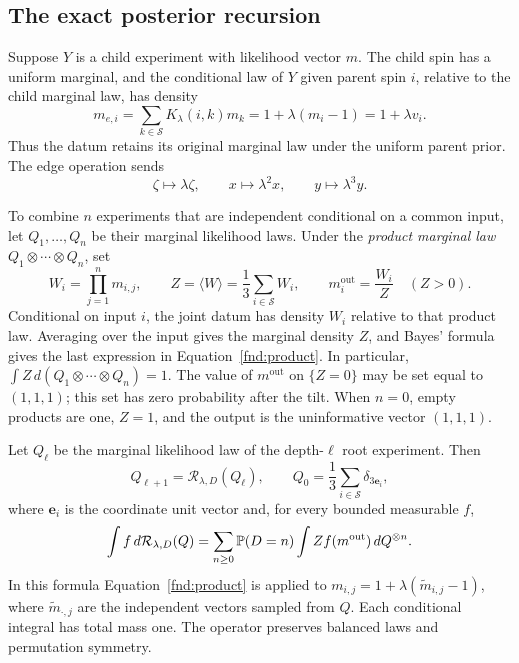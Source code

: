 \subsection{The exact posterior recursion}

Suppose \(Y\) is a child experiment with likelihood vector \(m\).
The child spin has a uniform marginal, and the conditional law of \(Y\)
given parent spin \(i\), relative to the child marginal law, has density
\begin{equation}\label{fnd:edge}
 m_{e,i}=\sum_{k\in\mathcal S}K_\lambda(i,k)m_k
        =1+\lambda(m_i-1)=1+\lambda v_i.
\end{equation}
Thus the datum retains its original marginal law under the uniform
parent prior.  The edge operation sends
\begin{equation}\label{fnd:edge-moments}
 \zeta\longmapsto\lambda\zeta,\qquad
 x\longmapsto\lambda^2x,\qquad y\longmapsto\lambda^3y.
\end{equation}

To combine \(n\) experiments that are independent conditional on a
common input, let \(Q_1,\ldots,Q_n\) be their marginal likelihood laws.
Under the \emph{product marginal law} \(Q_1\otimes\cdots\otimes Q_n\),
set
\begin{equation}\label{fnd:product}
 W_i=\prod_{j=1}^n m_{i,j},\qquad
 Z=\langle W\rangle=\frac13\sum_{i\in\mathcal S}W_i,\qquad
 m_i^{\mathrm{out}}=\frac{W_i}{Z}\quad(Z>0).
\end{equation}
Conditional on input \(i\), the joint datum has density \(W_i\)
relative to that product law.  Averaging over the input gives the
marginal density \(Z\), and Bayes' formula gives the last expression
in Equation~\eqref{fnd:product}.  In particular,
\(\int Z\,d(Q_1\otimes\cdots\otimes Q_n)=1\).
The value of \(m^{\mathrm{out}}\) on \(\{Z=0\}\) may be set equal
to \((1,1,1)\); this set has zero probability after the tilt.
When \(n=0\), empty products are one, \(Z=1\), and the output is
the uninformative vector \((1,1,1)\).

\begin{proposition}\label{fnd:recursion}
Let \(Q_\ell\) be the marginal likelihood law of the depth-\(\ell\)
root experiment.  Then
\begin{equation}\label{fnd:law-recursion}
 Q_{\ell+1}=\mathcal R_{\lambda,D}(Q_\ell),\qquad
 Q_0=\frac13\sum_{i\in\mathcal S}\delta_{3\mathbf e_i},
\end{equation}
where \(\mathbf e_i\) is the coordinate unit vector and, for every
bounded measurable \(f\),
\begin{equation}\label{fnd:operator}
 \int f\,d\mathcal R_{\lambda,D}(Q)
 =\sum_{n\geq0}\mathbb P(D=n)
   \int Z f(m^{\mathrm{out}})\,dQ^{\otimes n}.
\end{equation}
In this formula Equation~\eqref{fnd:product} is applied to
\(m_{i,j}=1+\lambda(\widetilde m_{i,j}-1)\), where
\(\widetilde m_{\cdot,j}\) are the independent vectors sampled from
\(Q\).  Each conditional integral has total mass one.  The operator
preserves balanced laws and permutation symmetry.
\end{proposition}

